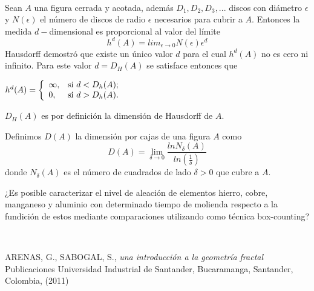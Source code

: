 \begin{titlepage}
\begin{minipage}{0.85\linewidth}
\begin{minipage}{0.85\linewidth}
\begin{resumen}
    \end{resumen}
   \end{minipage}
   \vspace{10pt}
\end{minipage}
\vspace{10pt}\\[5pt]
\begin{minipage}{0.5\linewidth}
\end{minipage}\hspace{-3pt}
\begin{minipage}{0.85\linewidth}
\footnotesize
\begin{definicion}
Sean $A$ una figura cerrada y acotada, adem\'as $D_1, D_2, D_3,...$
discos con di\'ametro $\epsilon$ y $N(\epsilon)$ el n\'umero de discos
de radio $\epsilon$ necesarios para cubrir a $A.$  Entonces la
medida $d-$dimensional es proporcional al valor del l\'imite
$$h^d(A)=lim_{\epsilon\longrightarrow 0}N(\epsilon)\epsilon ^d$$
Hausdorff demostr\'o que existe un \'unico valor $d$ para el cual
$h^d(A)$ no es cero ni infinito.  Para este valor $d=D_H(A)$ se
satisface entonces que \begin{center}
                       $h^d(A)=\left\{
                         \begin{array}{ll}
                           \infty, & \hbox{si $d<D_h(A)$;} \\
                           0, & \hbox{si $d>D_h(A)$.}
                         \end{array}
                       \right.$
\end{center}
$D_H(A)$ es por definici\'on la dimensi\'on de Hausdorff de $A.$
\end{definicion}
\begin{definicion}
Definimos $D(A)$ la dimensi\'on por cajas de una figura $A$ como
$$D(A)=\lim_{\delta\longrightarrow 0}\frac{ln N_{\delta}(A)}{ln(\frac{1}{\delta})}$$
donde $N_{\delta}(A)$ es el n\'umero de cuadrados de lado $\delta>0$
que cubre a $A.$
\end{definicion}

\begin{pregunta}
¿Es posible caracterizar el nivel de aleaci\'on de elementos hierro,
cobre, manganeso y aluminio con determinado tiempo de molienda
respecto a la fundici\'on de estos mediante comparaciones utilizando
como t\'ecnica box-counting?
\end{pregunta}
  \end{minipage}
\vspace{10pt}\\[5pt]
\begin{thebibliography}{99}
 ARENAS, G., SABOGAL, S., \textit{una introducci\'on a la geometr\'ia fractal} Publicaciones Universidad Industrial de
Santander, Bucaramanga, Santander, Colombia, (2011)


\end{thebibliography}
\end{titlepage}
